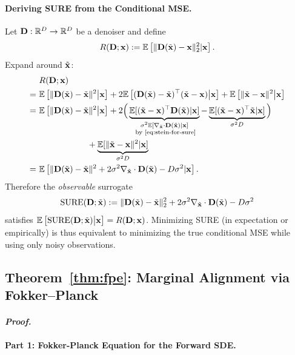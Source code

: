 \paragraph{Deriving SURE from the Conditional MSE.}
Let ${\mathbf{D}}:\mathbb{R}^D \to \mathbb{R}^D$ be a denoiser and define
\[
R({\mathbf{D}};{\mathbf{x}}):=\mathbb{E} \left[\|{\mathbf{D}}(\tilde{{\mathbf{x}}})-{\mathbf{x}}\|_2^2| {\mathbf{x}}\right].
\]
Expand around $\tilde{{\mathbf{x}}}$:
\[
\begin{aligned}
&~R(\rmD;\rvx) \\
=&~\E \left[\|\rmD(\tilde{\rvx})-\tilde{\rvx}\|^2  \big|  \rvx\right]
+2 \E \left[(\rmD(\tilde{\rvx})-\tilde{\rvx})^\top(\tilde{\rvx}-\rvx)  \big|  \rvx\right]
+\E \left[\|\tilde{\rvx}-\rvx\|^2  \big|  \rvx\right] \\
=&~\E \left[\|\rmD(\tilde{\rvx})-\tilde{\rvx}\|^2  \big|  \rvx\right]
+2\Big(\underbrace{\E[(\tilde{\rvx}-\rvx)^\top \rmD(\tilde{\rvx})|\rvx]}_{\substack{\sigma^2 \E[ \nabla_{\tilde{\rvx}} \cdot\rmD(\tilde{\rvx})|\rvx] \\  \text{ by \Cref{eq:stein-for-sure}}
}}
-\underbrace{\E[(\tilde{\rvx}-\rvx)^\top \tilde{\rvx}|\rvx]}_{ \sigma^2 D}\Big)
\\&\qquad\qquad\qquad+\underbrace{\E[\|\tilde{\rvx}-\rvx\|^2|\rvx]}_{ \sigma^2 D} \\
=&~\E \left[\|\rmD(\tilde{\rvx})-\tilde{\rvx}\|^2
+2\sigma^2  \nabla_{\tilde{\rvx}} \cdot\rmD(\tilde{\rvx})
-D\sigma^2 | \rvx\right].
\end{aligned}
\]
Therefore the \emph{observable} surrogate
\[ 
\mathrm{SURE}({\mathbf{D}};\tilde{{\mathbf{x}}})
:= \|{\mathbf{D}}(\tilde{{\mathbf{x}}})-\tilde{{\mathbf{x}}}\|_2^2
+2\sigma^2  \nabla_{\tilde{{\mathbf{x}}}} \cdot{\mathbf{D}}(\tilde{{\mathbf{x}}})
-D\sigma^2 
\]
satisfies $\mathbb{E} \left[\mathrm{SURE}({\mathbf{D}};\tilde{{\mathbf{x}}}) \big| {\mathbf{x}}\right]=R({\mathbf{D}};{\mathbf{x}})$.
Minimizing SURE (in expectation or empirically) is thus equivalent to minimizing the true conditional MSE while using only noisy observations.



\subsection{Theorem~\ref{thm:fpe}: Marginal Alignment via Fokker–Planck}\label{app-sec:scoresde-fpe-proof}

\paragraph{\textit{Proof.}}
\paragraph{Part 1: Fokker-Planck Equation for the Forward SDE.}


